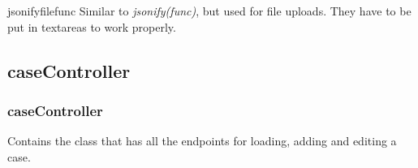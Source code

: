 \documentclass[letterpaper,10pt,english]{manual}
\begin{document}
\hypertarget{webscavator.controllers.baseController.jsonifyfile}{}\begin{funcdesc}{jsonifyfile}{func}
Similar to \emph{jsonify(func)}, but used for file uploads. 
They have to be put in textareas to work properly.
\end{funcdesc}

\resetcurrentobjects
\hypertarget{--doc-caseController}{}

\subsection{caseController}
\hypertarget{module-webscavator.controllers.caseController}{}
\modulesynopsis{}

\subsubsection{caseController}

Contains the class that has all the endpoints for loading, adding and editing a case.
\end{document}
